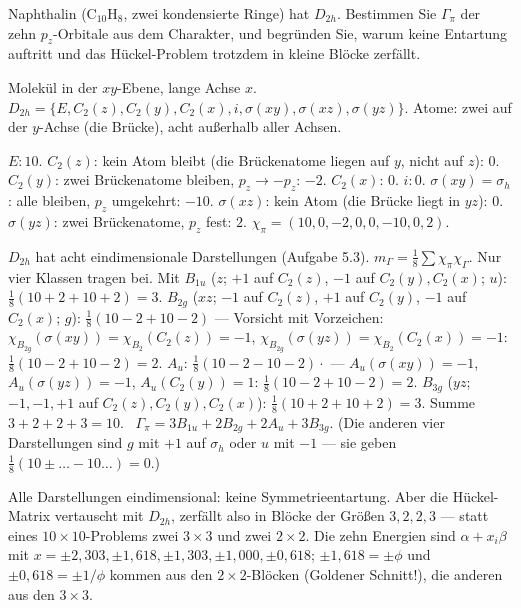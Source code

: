 \begin{aufgabe}
Naphthalin ($\mathrm{C_{10}H_8}$, zwei kondensierte Ringe) hat $D_{2h}$. Bestimmen Sie $\Gamma_\pi$ der zehn $p_z$-Orbitale aus dem Charakter, und begründen Sie, warum keine Entartung auftritt und das Hückel-Problem trotzdem in kleine Blöcke zerfällt.

\loesung
{}
Molekül in der $xy$-Ebene, lange Achse $x$. $D_{2h} = \{E, C_2(z), C_2(y), C_2(x), i, \sigma(xy), \sigma(xz), \sigma(yz)\}$. Atome: zwei auf der $y$-Achse (die Brücke), acht außerhalb aller Achsen.

$E\colon10$. $C_2(z)$: kein Atom bleibt (die Brückenatome liegen auf $y$, nicht auf $z$): $0$. $C_2(y)$: zwei Brückenatome bleiben, $p_z\to-p_z$: $-2$. $C_2(x)$: $0$. $i\colon0$. $\sigma(xy) = \sigma_h$: alle bleiben, $p_z$ umgekehrt: $-10$. $\sigma(xz)$: kein Atom (die Brücke liegt in $yz$): $0$. $\sigma(yz)$: zwei Brückenatome, $p_z$ fest: $2$. $\chi_\pi = (10, 0, -2, 0, 0, -10, 0, 2)$.

$D_{2h}$ hat acht eindimensionale Darstellungen (Aufgabe 5.3). $m_\Gamma = \frac18\sum\chi_\pi\chi_\Gamma$. Nur vier Klassen tragen bei. Mit $B_{1u}$ ($z$; $+1$ auf $C_2(z)$, $-1$ auf $C_2(y), C_2(x)$; $u$): $\frac18(10 + 2 + 10 + 2) = 3$. $B_{2g}$ ($xz$; $-1$ auf $C_2(z)$, $+1$ auf $C_2(y)$, $-1$ auf $C_2(x)$; $g$): $\frac18(10 - 2 + 10 - 2)$ --- Vorsicht mit Vorzeichen: $\chi_{B_{2g}}(\sigma(xy)) = \chi_{B_2}(C_2(z)) = -1$, $\chi_{B_{2g}}(\sigma(yz)) = \chi_{B_2}(C_2(x)) = -1$: $\frac18(10 - 2 + 10 - 2) = 2$. $A_u$: $\frac18(10 - 2 - 10 - 2)\cdot$ --- $A_u(\sigma(xy)) = -1$, $A_u(\sigma(yz)) = -1$, $A_u(C_2(y)) = 1$: $\frac18(10 - 2 + 10 - 2) = 2$. $B_{3g}$ ($yz$; $-1, -1, +1$ auf $C_2(z), C_2(y), C_2(x)$): $\frac18(10 + 2 + 10 + 2) = 3$. Summe $3 + 2 + 2 + 3 = 10$. \checkmark\ $\Gamma_\pi = 3B_{1u} + 2B_{2g} + 2A_u + 3B_{3g}$. (Die anderen vier Darstellungen sind $g$ mit $+1$ auf $\sigma_h$ oder $u$ mit $-1$ --- sie geben $\frac18(10 \pm \dots - 10\dots) = 0$.)

Alle Darstellungen eindimensional: keine Symmetrieentartung. Aber die Hückel-Matrix vertauscht mit $D_{2h}$, zerfällt also in Blöcke der Größen $3, 2, 2, 3$ --- statt eines $10\times10$-Problems zwei $3\times3$ und zwei $2\times2$. Die zehn Energien sind $\alpha + x_i\beta$ mit $x = \pm2{,}303, \pm1{,}618, \pm1{,}303, \pm1{,}000, \pm0{,}618$; $\pm1{,}618 = \pm\phi$ und $\pm0{,}618 = \pm1/\phi$ kommen aus den $2\times2$-Blöcken (Goldener Schnitt!), die anderen aus den $3\times3$.


\end{aufgabe}
